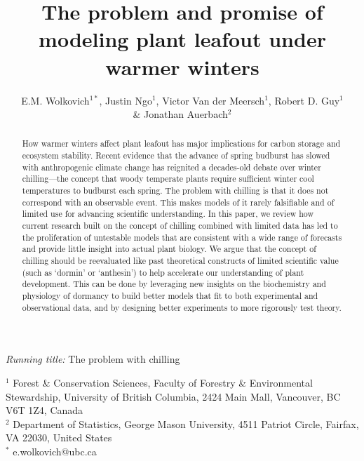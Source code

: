 \documentclass[11pt]{article}
\begin{document}
\renewcommand{\refname}{\CHead{}}


\title{The problem and promise of \\ modeling plant leafout under warmer winters} 
\author{E.M. Wolkovich$^{1*}$, Justin Ngo$^1$, Victor Van der Meersch$^1$, Robert D. Guy$^1$ \\ \& Jonathan Auerbach$^2$} 
\maketitle

\emph{Running title:} The problem with chilling

$^1$ Forest \& Conservation Sciences, Faculty of Forestry \& Environmental Stewardship, University of British Columbia, 2424 Main Mall, Vancouver, BC V6T 1Z4, Canada\\
$^2$ Department of Statistics, George Mason University, 4511 Patriot Circle, Fairfax, VA 22030, United States\\
$^*$ e.wolkovich@ubc.ca

\newpage
\linenumbers
\begin{abstract} 
How warmer winters affect plant leafout has major implications for carbon storage and ecosystem stability. Recent evidence that the advance of spring budburst has slowed with anthropogenic climate change has reignited a decades-old debate over winter chilling---the concept that woody temperate plants require sufficient winter cool temperatures to budburst each spring. The problem with chilling is that it does not correspond with an observable event.  This makes models of it rarely falsifiable and of limited use for advancing scientific understanding. In this paper, we review how current research built on the concept of chilling combined with limited data has led to the proliferation of untestable models that are consistent with a wide range of forecasts and provide little insight into actual plant biology. We argue that the concept of chilling should be reevaluated like past theoretical constructs of limited scientific value (such as `dormin' or  `anthesin') to help accelerate our understanding of plant development. This can be done by leveraging new insights on the biochemistry and physiology of dormancy to build better models that fit to both experimental and observational data, and by designing better experiments to more rigorously test theory. 
\end{abstract}
\end{document}
